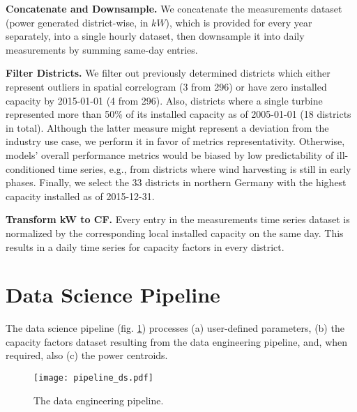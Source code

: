 \vspace{1em}
\noindent
\textbf{Concatenate and Downsample.}  We concatenate the measurements dataset (power generated district-wise, in $kW$), which is provided for every year separately, into a single hourly dataset, then downsample it into daily measurements by summing same-day entries.

\vspace{1em}
\noindent
\textbf{Filter Districts.}   We filter out previously determined districts which either represent outliers in spatial correlogram (3 from 296) or have zero installed capacity by 2015-01-01 (4 from 296).
Also, districts where a single turbine represented more than 50\% of its installed capacity as of 2005-01-01 (18 districts in total).
Although the latter measure might represent a deviation from the industry use case, we perform it in favor of metrics representativity. Otherwise, models' overall performance metrics would be biased by low predictability of ill-conditioned time series, e.g., from districts where wind harvesting is still in early phases.
Finally, we select the 33 districts in northern Germany with the highest capacity installed as of 2015-12-31.

\vspace{1em}
\noindent
\textbf{Transform kW to CF.}  Every entry in the measurements time series dataset is normalized by the corresponding local installed capacity on the same day.
This results in a daily time series for capacity factors in every district.

\pagebreak

\section{Data Science Pipeline}
The data science pipeline (fig. \ref{fig:pipeline_ds}) processes (a) user-defined parameters, (b) the capacity factors dataset resulting from the data engineering pipeline, and, when required, also (c) the power centroids.

\begin{figure}[H]
   \centering
    \caption{The data engineering pipeline.}
    \texttt{[image: pipeline\_ds.pdf]}
   \label{fig:pipeline_ds}
\end{figure}

\pagebreak

